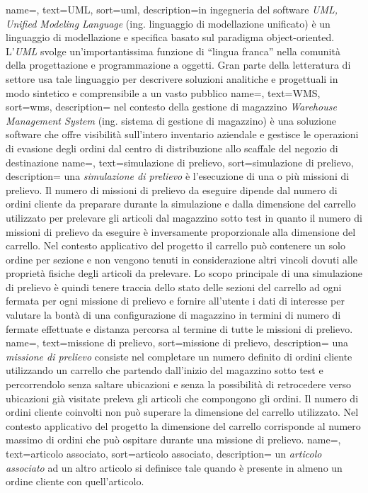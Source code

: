  {
    name=,
    text=UML,
    sort=uml,
    description={in ingegneria del software \emph{UML, Unified Modeling Language} (ing. linguaggio di modellazione unificato) è un linguaggio di modellazione e specifica basato sul paradigma object-oriented. L'\emph{UML} svolge un'importantissima funzione di ``lingua franca'' nella comunità della progettazione e programmazione a oggetti. Gran parte della letteratura di settore usa tale linguaggio per descrivere soluzioni analitiche e progettuali in modo sintetico e comprensibile a un vasto pubblico}
}
 {
    name=,
    text=WMS,
    sort=wms,
    description={ nel contesto della gestione di magazzino \emph{Warehouse Management System} (ing. sistema di gestione di magazzino) è una soluzione software che offre visibilità sull'intero inventario aziendale e gestisce le operazioni di evasione degli ordini dal centro di distribuzione allo scaffale del negozio di destinazione}
}
 {
    name=,
    text=simulazione di prelievo,
    sort=simulazione di prelievo,
    description={ una \emph{simulazione di prelievo} è l'esecuzione di una o più missioni di prelievo.
    Il numero di missioni di prelievo da eseguire dipende dal numero di ordini cliente da preparare durante la simulazione
    e dalla dimensione del carrello utilizzato per prelevare gli articoli dal magazzino sotto test in quanto il 
    numero di missioni di prelievo da eseguire è inversamente proporzionale alla dimensione del carrello.
    Nel contesto applicativo del progetto il carrello può contenere un solo ordine per sezione e non vengono tenuti in 
    considerazione altri vincoli dovuti alle proprietà fisiche degli articoli da prelevare.
    Lo scopo principale di una simulazione di prelievo è quindi tenere traccia dello stato delle sezioni del carrello 
    ad ogni fermata per ogni missione di prelievo e fornire all'utente i dati di interesse per valutare la bontà di una
    configurazione di magazzino in termini di numero di fermate effettuate e distanza percorsa al termine di tutte le missioni 
    di prelievo. 
    }}
 {
    name=,
    text=missione di prelievo,
    sort=missione di prelievo,
    description={ una \emph{missione di prelievo} consiste nel completare un numero definito di ordini cliente
    utilizzando un carrello che partendo dall'inizio del magazzino sotto test e percorrendolo
    senza saltare ubicazioni e senza la possibilità di retrocedere verso ubicazioni già
    visitate preleva gli articoli che compongono gli ordini.
    Il numero di ordini cliente coinvolti non può superare la dimensione del carrello utilizzato.
    Nel contesto applicativo del progetto la dimensione del carrello corrisponde al numero massimo di ordini che può 
    ospitare durante una missione di prelievo.
    }}
 {
    name=,
    text=articolo associato,
    sort=articolo associato,
    description={ un \emph{articolo associato} ad un altro articolo si definisce tale quando è presente in almeno un 
    ordine cliente con quell'articolo.
    }
}

